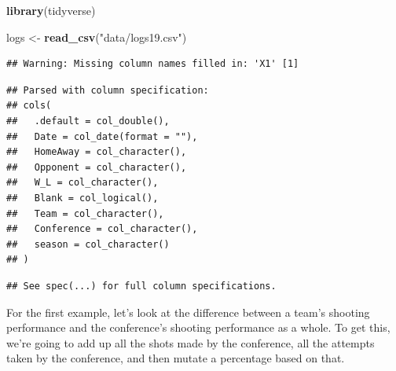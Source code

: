 \documentclass[]{book}
\newenvironment{Shaded}{\begin{snugshade}}{\end{snugshade}}
\newcommand{\DataTypeTok}[1]{\textcolor[rgb]{0.13,0.29,0.53}{#1}}
\newcommand{\KeywordTok}[1]{\textcolor[rgb]{0.13,0.29,0.53}{\textbf{#1}}}
\newcommand{\NormalTok}[1]{#1}
\newcommand{\OperatorTok}[1]{\textcolor[rgb]{0.81,0.36,0.00}{\textbf{#1}}}
\newcommand{\StringTok}[1]{\textcolor[rgb]{0.31,0.60,0.02}{#1}}
\begin{document}
\begin{Shaded}
\begin{Highlighting}[]
\KeywordTok{library}\NormalTok{(tidyverse)}
\end{Highlighting}
\end{Shaded}

\begin{Shaded}
\begin{Highlighting}[]
\NormalTok{logs <-}\StringTok{ }\KeywordTok{read_csv}\NormalTok{(}\StringTok{"data/logs19.csv"}\NormalTok{)}
\end{Highlighting}
\end{Shaded}

\begin{verbatim}
## Warning: Missing column names filled in: 'X1' [1]
\end{verbatim}

\begin{verbatim}
## Parsed with column specification:
## cols(
##   .default = col_double(),
##   Date = col_date(format = ""),
##   HomeAway = col_character(),
##   Opponent = col_character(),
##   W_L = col_character(),
##   Blank = col_logical(),
##   Team = col_character(),
##   Conference = col_character(),
##   season = col_character()
## )
\end{verbatim}

\begin{verbatim}
## See spec(...) for full column specifications.
\end{verbatim}

For the first example, let's look at the difference between a team's shooting performance and the conference's shooting performance as a whole. To get this, we're going to add up all the shots made by the conference, all the attempts taken by the conference, and then mutate a percentage based on that.

\begin{Shaded}
\end{Shaded}
\end{document}
